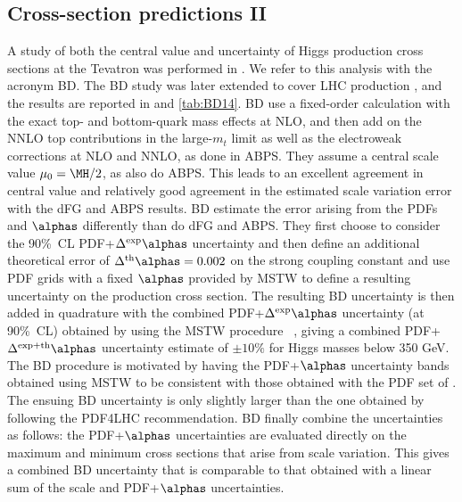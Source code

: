 \subsection{Cross-section predictions II}
\label{se:ggfXS2}

\noindent



	 A study of both the central value and uncertainty of Higgs production
cross sections at the Tevatron was performed in . We refer to this
analysis with the acronym BD. The BD study was later extended to cover LHC
production \cite{Baglio:2010ae}, and the results are reported in
 and \ref{tab:BD14}. BD use  a
fixed-order calculation with the exact top- and bottom-quark mass effects at
NLO, and then add on the NNLO top contributions in the large-$m_t$ limit as well
as the electroweak corrections at NLO and NNLO, as done in ABPS. They assume a
central scale value $\mu_0=  \MH/2$, as also do ABPS. This leads to an
excellent agreement in central value and relatively good agreement in the
estimated scale variation error with the dFG and ABPS results. BD estimate the
error arising from the PDFs and $\alphas$ differently than do dFG and ABPS.
They first choose to consider the 90\%\ CL PDF+$\Delta^{\rm exp}\alphas$
uncertainty and then define an additional theoretical error of $\Delta^{\rm
th}\alphas = 0.002$ on the strong coupling constant and use PDF grids with a
fixed $\alphas$ provided by MSTW to define a resulting uncertainty on the
production cross section. The resulting BD uncertainty is then added in quadrature
with the combined PDF+$\Delta^{\rm exp}\alphas$  uncertainty (at 90\%\ CL)
obtained by using the MSTW procedure ~\cite{Martin:2009bu}, giving a combined PDF+$\Delta^{\rm 
exp+th}\alphas$ uncertainty estimate of $\pm 10\%$ for Higgs masses below 350
GeV. The BD procedure is motivated by having the PDF+$\alphas$ uncertainty
bands obtained using MSTW to be consistent with those obtained with the PDF set
of . The ensuing BD uncertainty is only slightly larger than the one
obtained by following the PDF4LHC recommendation. BD finally combine the
uncertainties as follows: the PDF+$\alphas$ uncertainties are evaluated
directly on the maximum and minimum cross sections that arise from scale
variation. This gives a combined BD uncertainty that is comparable to that obtained
with a linear sum of the scale and PDF+$\alphas$ uncertainties. 


